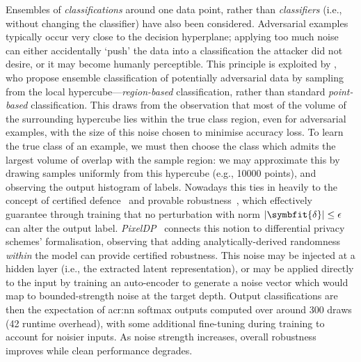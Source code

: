 Ensembles of \emph{classifications} around one data point, rather than \emph{classifiers} (i.e., without changing the classifier) have also been considered.
Adversarial examples typically occur very close to the decision hyperplane; applying too much noise can either accidentally `push' the data into a classification the attacker did not desire, or it may become humanly perceptible.
This principle is exploited by \textcite{DBLP:conf/acsac/CaoG17}, who propose ensemble classification of potentially adversarial data by sampling from the local hypercube---\emph{region-based} classification, rather than standard \emph{point-based} classification.
This draws from the observation that most of the volume of the surrounding hypercube lies within the true class region, even for adversarial examples, with the size of this noise chosen to minimise accuracy loss.
To learn the true class of an example, we must then choose the class which admits the largest volume of overlap with the sample region: we may approximate this by drawing samples uniformly from this hypercube (e.g., \num{10000} points), and observing the output histogram of labels.
Nowadays this ties in heavily to the concept of certified defence~\parencite{DBLP:conf/iclr/RaghunathanSL18} and provable robustness~\parencite{DBLP:conf/iclr/ZhangCXGSLBH20}, which effectively guarantee through training that no perturbation with norm $|\symbfit{\delta}| \le \epsilon$ can alter the output label.
\emph{PixelDP}~\parencite{DBLP:conf/sp/LecuyerAG0J19} connects this notion to differential privacy schemes' formalisation, observing that adding analytically-derived randomness \emph{within} the model can provide certified robustness.
This noise may be injected at a hidden layer (i.e., the extracted latent representation), or may be applied directly to the input by training an auto-encoder to generate a noise vector which would map to bounded-strength noise at the target depth.
Output classifications are then the expectation of \gls{acr:nn} softmax outputs computed over around \num{300} draws (\qty{42}{\times} runtime overhead), with some additional fine-tuning during training to account for noisier inputs.
As noise strength increases, overall robustness improves while clean performance degrades.


